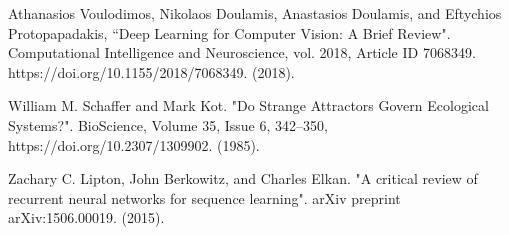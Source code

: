 \documentclass[letterpaper, 10 pt, conference]{ieeeconf}  %
\begin{document}
\begin{thebibliography}{99}
 Athanasios Voulodimos, Nikolaos Doulamis, Anastasios Doulamis, and Eftychios Protopapadakis, “Deep Learning for Computer Vision: A Brief Review". Computational Intelligence and Neuroscience, vol. 2018, Article ID 7068349. https://doi.org/10.1155/2018/7068349. (2018).

 William M. Schaffer and Mark Kot. "Do Strange Attractors Govern Ecological Systems?". BioScience, Volume 35, Issue 6, 342–350, https://doi.org/10.2307/1309902. (1985).

 Zachary C. Lipton, John Berkowitz, and Charles Elkan. "A critical review of recurrent neural networks for sequence learning". arXiv preprint arXiv:1506.00019. (2015).
\end{thebibliography}
\end{document}
